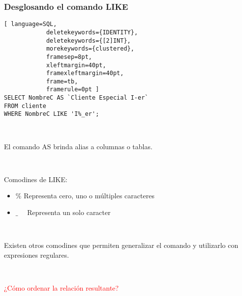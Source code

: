 \begin{frame}[fragile]
	
	\frametitle{Desglosando el comando LIKE}
	
			\begin{lstlisting}[ language=SQL,
			deletekeywords={IDENTITY},
			deletekeywords={[2]INT},
			morekeywords={clustered},
			framesep=8pt,
			xleftmargin=40pt,
			framexleftmargin=40pt,
			frame=tb,
			framerule=0pt ]
SELECT NombreC AS `Cliente Especial I-er`
FROM cliente 
WHERE NombreC LIKE 'I%_er';
\end{lstlisting}

	\ 
	
	El comando \textcolor{codepurple}{AS} brinda alias a columnas o tablas.
	
	\pause
	
	\ 
	
	Comodines de  \textcolor{codepurple}{LIKE}: 
	\begin{itemize}
		
		\item \textcolor{codepurple}{$\%$} Representa cero, uno o múltiples caracteres
		
		\item \textcolor{codepurple}{\textbf{$\_$}} \ \ Representa un solo caracter
					
	\end{itemize}
	
	\pause 
	
	\ 
	
	Existen otros comodines que permiten generalizar el comando y utilizarlo con expresiones regulares.
	
	\pause
	
	\ 
	
	\textcolor{red}{¿Cómo ordenar la relación resultante?}
	
\end{frame}


